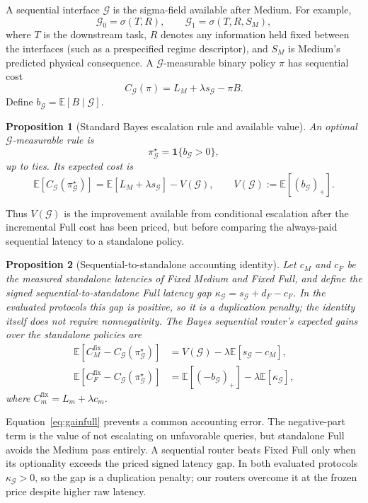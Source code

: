 \documentclass[10pt]{article}
\newtheorem{proposition}{Proposition}
\theoremstyle{definition}
\theoremstyle{remark}
\newcommand{\E}{\mathbb{E}}
\newcommand{\G}{\mathcal{G}}
\newcommand{\pos}[1]{\left(#1\right)_{+}}
\begin{document}
A sequential interface $\G$ is the sigma-field available after Medium.  For
example,
\[
  \G_0=\sigma(T,R),\qquad
  \G_1=\sigma(T,R,S_M),
\]
where $T$ is the downstream task, $R$ denotes any information held fixed
between the interfaces (such as a prespecified regime descriptor), and $S_M$
is Medium's predicted physical consequence.  A $\G$-measurable
binary policy $\pi$ has sequential cost
\begin{equation}
  C_{\G}(\pi)=L_M+\lambda s_{\G}-\pi B.
  \label{eq:routercost}
\end{equation}
Define $b_{\G}=\E[B\mid\G]$.

\begin{proposition}[Standard Bayes escalation rule and available value]
\label{prop:bayes}
An optimal $\G$-measurable rule is
\[
  \pi^\star_{\G}=\mathbf{1}\{b_{\G}>0\},
\]
up to ties.  Its expected cost is
\[
  \E[C_{\G}(\pi^\star_{\G})]
  =\E[L_M+\lambda s_{\G}]-V(\G),
  \qquad
  V(\G):=\E[\pos{b_{\G}}].
\]
\end{proposition}

Thus $V(\G)$ is the improvement available from conditional escalation after
the incremental Full cost has been priced, but before comparing the
always-paid sequential latency to a standalone policy.

\begin{proposition}[Sequential-to-standalone accounting identity]
\label{prop:standalone}
Let $c_M$ and $c_F$ be the measured standalone latencies of Fixed Medium and
Fixed Full, and define the signed sequential-to-standalone Full latency gap
$\kappa_{\G}=s_{\G}+d_F-c_F$.  In the evaluated protocols this gap is
positive, so it is a duplication penalty; the identity itself does not require
nonnegativity.  The Bayes sequential router's expected gains
over the standalone policies are
\begin{align}
 \E[C_M^{\mathrm{fix}}-C_{\G}(\pi^\star_{\G})]
 &=V(\G)-\lambda\E[s_{\G}-c_M],
 \label{eq:gainmedium}\\
 \E[C_F^{\mathrm{fix}}-C_{\G}(\pi^\star_{\G})]
 &=\E[\pos{-b_{\G}}]-\lambda\E[\kappa_{\G}],
 \label{eq:gainfull}
\end{align}
where $C_m^{\mathrm{fix}}=L_m+\lambda c_m$.
\end{proposition}

Equation~\eqref{eq:gainfull} prevents a common accounting error.  The
negative-part term is the value of not escalating on unfavorable queries, but
standalone Full avoids the Medium pass entirely.  A sequential router beats
Fixed Full only when its optionality exceeds the priced signed latency gap.
In both evaluated protocols $\kappa_{\G}>0$, so the gap is a duplication
penalty; our routers overcome it at the frozen price despite higher raw
latency.
\end{document}
